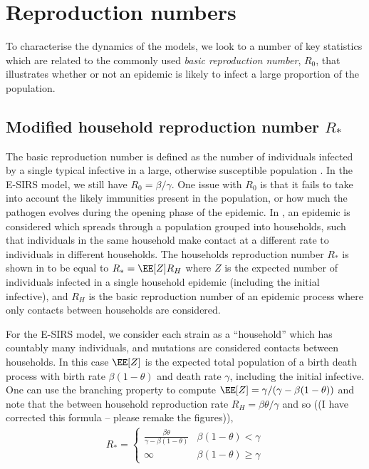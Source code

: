 \documentclass[review]{elsarticle}
\begin{document}
\section{Reproduction numbers}\label{sec: repro}
To characterise the dynamics of the models, we look to a number of key statistics which are related to the commonly used \emph{basic reproduction number}, $R_0$, that illustrates whether or not an epidemic is likely to infect a large proportion of the population. 

\subsection{Modified household reproduction number $R_*$}\label{subsec: rstar}
The basic reproduction number is defined as the number of individuals infected by a single typical infective in a large, otherwise susceptible population \cite{Anderson1992}. In the E-SIRS model, we still have $R_0 = \beta/\gamma$. One issue with $R_0$ is that it fails to take into account the likely immunities present in the population, or how much the pathogen evolves during the opening phase of the epidemic. In \cite{Ball1997}, an epidemic is considered which spreads through a population grouped into households, such that individuals in the same household make contact at a different rate to individuals in different households. The households reproduction number $R_*$ is shown in \cite{Ball1997} to be equal to $R_* = \EE[Z]R_H$
where $Z$ is the expected number of individuals infected in a single household epidemic (including the initial infective), and $R_H$ is the basic reproduction number of an epidemic process where only contacts between households are considered. 

For the E-SIRS model, we consider each strain as a ``household'' which has countably many individuals, and mutations are considered contacts between households. In this case $\EE[Z]$ is the expected total population of a birth death process with birth rate $\beta(1-\theta)$ and death rate $\gamma$, including the initial infective. One can use the branching property to compute $\EE[Z]=\gamma/(\gamma-\beta(1-\theta))$ and note that the between household reproduction rate $R_H=\beta\theta/\gamma$ and so ((I have corrected this formula -- please remake the figures)),
\begin{align*}
R_* = \begin{cases}
\frac{\beta\theta}{\gamma - \beta(1-\theta)} & \beta(1-\theta) < \gamma \\
\infty & \beta(1-\theta) \geq \gamma
\end{cases}
\end{align*}
\end{document}
